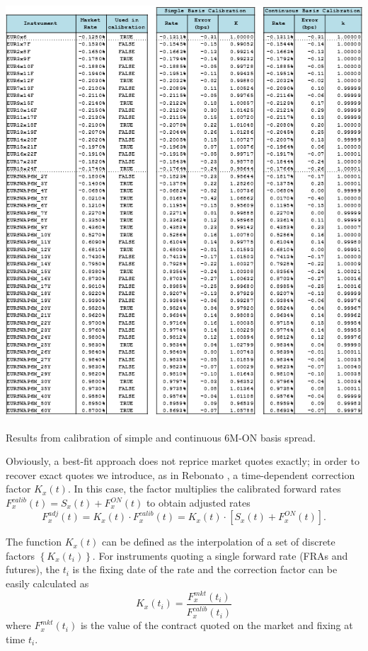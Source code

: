\documentclass{article}
\begin{document}
\begin{table}[p]
\centering
\includegraphics[width=1\textwidth]{6mBasisFit.png}
\caption{Results from calibration of simple and continuous 6M-ON basis spread.}
\label{6mBasisFit}
\end{table}

Obviously, a best-fit approach does not reprice market quotes exactly; in order to recover exact quotes we introduce, as in Rebonato \cite{rebonato}, a time-dependent correction factor $K_x(t)$.
In this case, the factor multiplies the calibrated forward rates $F_x^{calib}(t) = S_x(t) + F_x^{ON}(t)$ to obtain adjusted rates $$F_x^{adj}(t) = K_x(t) \cdot F_x^{calib}(t) = K_x(t) \cdot [S_x(t) + F_x^{ON}(t)].$$

The function $K_x(t)$ can be defined as the interpolation of a set of discrete factors $\left\{K_x(t_i)\right\}$. 
For instruments quoting a single forward rate (FRAs and futures), the $t_i$ is the fixing date of the rate and the correction factor can be easily calculated as
\begin{equation}
\label{direct-k}
K_x(t_i) = \frac{F_x^{mkt}(t_i)}{F_x^{calib}(t_i)}
\end{equation}
where $F_x^{mkt}(t_i)$ is the value of the contract quoted on the market and fixing at time $t_i$.
\end{document}
